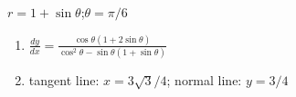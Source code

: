 {$r=1+\sin\theta$;\quad $\theta = \pi/6$}
{\begin{enumerate}
	\item $\frac{dy}{dx} = \frac{\cos\theta(1+2\sin\theta)}{\cos^2\theta-\sin\theta(1+\sin\theta)}$
	\item	tangent line: $x=3\sqrt{3}/4$; normal line: $y=3/4$
\end{enumerate}}
